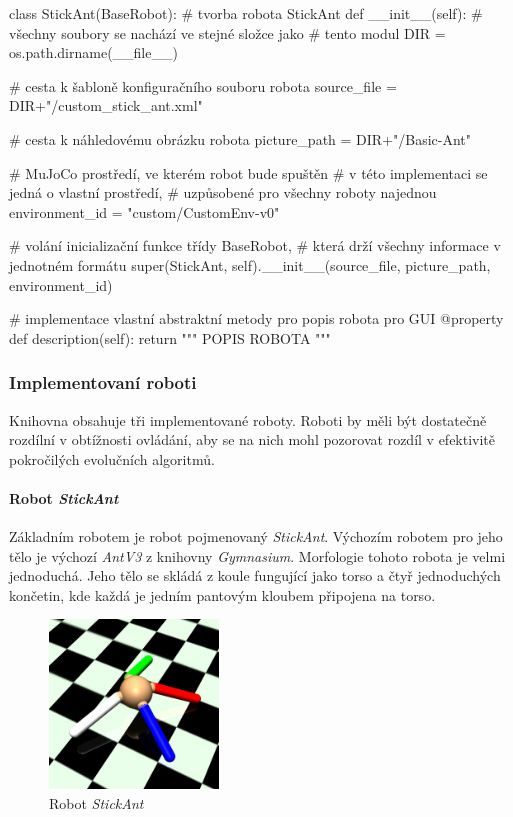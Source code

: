 \begin{code}
class StickAnt(BaseRobot): # tvorba robota StickAnt
    def __init__(self):
        # všechny soubory se nachází ve stejné složce jako 
        # tento modul
        DIR = os.path.dirname(__file__)

        # cesta k šabloně konfiguračního souboru robota
        source_file = DIR+"/custom_stick_ant.xml"

        # cesta k náhledovému obrázku robota
        picture_path = DIR+"/Basic-Ant"

        # MuJoCo prostředí, ve kterém robot bude spuštěn
        # v této implementaci se jedná o vlastní prostředí,
        # uzpůsobené pro všechny roboty najednou
        environment_id = "custom/CustomEnv-v0"

        # volání inicializační funkce třídy BaseRobot,
        # která drží všechny informace v jednotném formátu
        super(StickAnt, self).__init__(source_file, 
                                       picture_path, 
                                       environment_id)

    # implementace vlastní abstraktní metody pro popis robota pro GUI
    @property
    def description(self):
        return """ POPIS ROBOTA """
\end{code}

\subsubsection{Implementovaní roboti}
Knihovna obsahuje tři implementované roboty. Roboti by měli být dostatečně
rozdílní v obtížnosti ovládání, aby se na nich mohl pozorovat rozdíl v
efektivitě pokročilých evolučních algoritmů.

\paragraph{Robot \emph{StickAnt}} \label{imp:robots.StickAnt}
Základním robotem je robot pojmenovaný \emph{StickAnt}. Výchozím robotem pro
jeho tělo je výchozí \emph{AntV3} z knihovny \emph{Gymnasium}. Morfologie
tohoto robota je velmi jednoduchá. Jeho tělo se skládá z koule fungující jako
torso a čtyř jednoduchých končetin, kde každá je jedním pantovým kloubem
připojena na torso.
\begin{figure}[!htb]
    \centering
    \includegraphics[width=0.4\textwidth]{../img/crop_Basic-Ant.jpg}
    \caption{Robot \emph{StickAnt}}
\end{figure}


